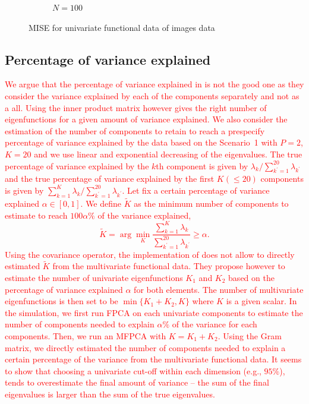 \begin{results}
\begin{figure}
\begin{subfigure}[b]{0.49\textwidth}
         \caption{$N = 100$}
         \label{fig:mise_mfd_2d_100}
    \end{subfigure}
    \caption{MISE for univariate functional data of images data}
    \label{fig:mise_mfd_2d}
\end{figure}

\end{results}



\subsection{Percentage of variance explained} %
\label{sub:percentage_of_variance_explained_simulation}

\textcolor{red}{We argue that the percentage of variance explained in \cite{happMultivariateFunctionalPrincipal2018a} is not the good one as they consider the variance explained by each of the components separately and not as a all. Using the inner product matrix however gives the right number of eigenfunctions for a given amount of variance explained.
We also consider the estimation of the number of components to retain to reach a prespecify percentage of variance explained by the data based on the Scenario~1 with $P = 2$, $K = 20$ and we use linear and exponential decreasing of the eigenvalues. The true percentage of variance explained by the $k$th component is given by $\lambda_k / \sum_{k^\prime = 1}^{20} \lambda_{k^\prime}$ and the true percentage of variance explained by the first $K (\leq 20)$ components is given by $\sum_{k = 1}^K \lambda_k / \sum_{k^\prime = 1}^{20} \lambda_{k^\prime}$.
Let fix a certain percentage of variance explained $\alpha \in [0, 1]$. We define $\widetilde{K}$ as the minimum number of components to estimate to reach $100\alpha\%$ of the variance explained,
\begin{equation}
    \widetilde{K} = \arg\min_K \frac{\sum_{k = 1}^K \lambda_k}{\sum_{k^\prime = 1}^{20} \lambda_{k^\prime}} \geq \alpha.
\end{equation}
Using the covariance operator, the implementation of \cite{happMultivariateFunctionalPrincipal2018a} does not allow to directly estimated $\widetilde{K}$ from the multivariate functional data. They propose however to estimate the number of univariate eigenfunctions $K_1$ and $K_2$ based on the percentage of variance explained $\alpha$ for both elements. The number of multivariate eigenfunctions is then set to be $\min\{K_1 + K_2, K\}$ where $K$ is a given scalar. In the simulation, we first run FPCA on each univariate components to estimate the number of components needed to explain $\alpha\%$ of the variance for each components. Then, we run an MFPCA with $K = K_1 + K_2$. Using the Gram matrix, we directly estimated the number of components needed to explain a certain percentage of the variance from the multivariate functional data.
It seems to show that choosing a univariate cut-off within each dimension (e.g., $95\%$), tends to overestimate the final amount of variance – the sum of the final eigenvalues is larger than the sum of the true eigenvalues.}



